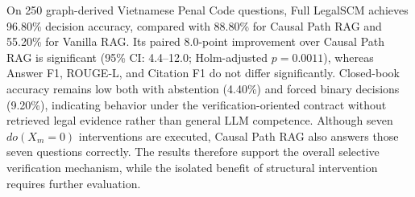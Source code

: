 On 250 graph-derived Vietnamese Penal Code questions, Full LegalSCM achieves
96.80\% decision accuracy, compared with 88.80\% for Causal Path RAG and
55.20\% for Vanilla RAG. Its paired 8.0-point improvement over Causal Path RAG
is significant (95\% CI: 4.4--12.0; Holm-adjusted $p=0.0011$), whereas Answer
F1, ROUGE-L, and Citation F1 do not differ significantly. Closed-book accuracy
remains low both with abstention (4.40\%) and forced binary decisions (9.20\%),
indicating behavior under the verification-oriented contract without retrieved
legal evidence rather than general LLM competence. Although seven
$do(X_m=0)$ interventions are executed, Causal Path RAG also answers those
seven questions correctly. The results therefore support the overall selective
verification mechanism, while the isolated benefit of structural intervention
requires further evaluation.
